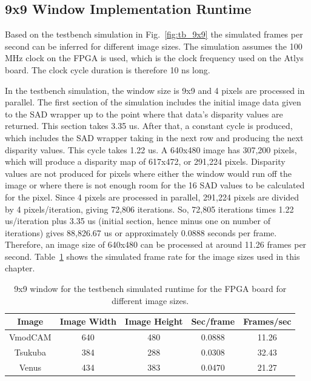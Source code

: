 \subsection{9x9 Window Implementation Runtime}
\label{sec:testbench9x9}

Based on the testbench simulation in Fig.~\ref{fig:tb_9x9} the simulated frames per second can be inferred for different image sizes. The simulation assumes the 100 MHz clock on the FPGA is used, which is the clock frequency used on the Atlys board. The clock cycle duration is therefore 10 ns long.

In the testbench simulation, the window size is 9x9 and 4 pixels are processed in parallel. The first section of the simulation includes the initial image data given to the SAD wrapper up to the point where that data's disparity values are returned. This section takes 3.35 us. After that, a constant cycle is produced, which includes the SAD wrapper taking in the next row and producing the next disparity values. This cycle takes 1.22 us. A 640x480 image has 307,200 pixels, which will produce a disparity map of 617x472, or 291,224 pixels. Disparity values are not produced for pixels where either the window would run off the image or where there is not enough room for the 16 SAD values to be calculated for the pixel. Since 4 pixels are processed in parallel, 291,224 pixels are divided by 4 pixels/iteration, giving 72,806 iterations. So, 72,805 iterations times 1.22 us/iteration plus 3.35 us (initial section, hence minus one on number of iterations) gives 88,826.67 us or approximately 0.0888 seconds per frame. Therefore, an image size of 640x480 can be processed at around 11.26 frames per second. Table~\ref{table:tb_9x9} shows the simulated frame rate for the image sizes used in this chapter.

\begin{table}
	\begin{center}
		\begin{tabular}{|c|c|c|c|c|}
			\hline 
				\rowstyle{\bfseries} Image & 
				\rowstyle{\bfseries} Image Width & 
				\rowstyle{\bfseries} Image Height & 
				\rowstyle{\bfseries} Sec/frame & 
				\rowstyle{\bfseries} Frames/sec
			\tabularnewline
			\hline 
			VmodCAM & 640 & 480 & 0.0888 & 11.26
			\tabularnewline
			\hline 
			Tsukuba & 384 & 288 & 0.0308 & 32.43
			\tabularnewline
			\hline 
			Venus & 434 & 383 & 0.0470 & 21.27
			\tabularnewline
			\hline 			
			\end{tabular}
		\captionfonts
		\caption{9x9 window for the testbench simulated runtime for the FPGA board for different image sizes.}
		\label{table:tb_9x9}
	\end{center}
\end{table}

